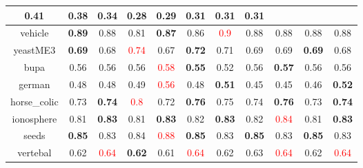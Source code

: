 \documentclass{article}%
\begin{document}
\begin{tabular}{c|cccccccccc}
{0.41
}&0.38&\textbf{0.34}&0.28&0.29&\textbf{0.31}&0.31&0.31\\%
\hline%
vehicle&\textbf{0.89}&0.88&0.81&\textbf{0.87}&0.86&\textcolor{red}{ 
0.9
}&0.88&0.88&0.88&0.88\\%
\hline%
yeastME3&\textbf{0.69}&0.68&\textcolor{red}{ 
0.74
}&0.67&\textbf{0.72}&0.71&0.69&0.69&\textbf{0.69}&0.68\\%
\hline%
bupa&0.56&0.56&0.56&\textcolor{red}{ 
0.58
}&\textbf{0.55}&0.52&0.56&\textbf{0.57}&0.56&0.56\\%
\hline%
german&0.48&0.48&0.49&\textcolor{red}{ 
0.56
}&0.48&\textbf{0.51}&0.45&0.45&0.46&\textbf{0.52}\\%
\hline%
horse\_colic&0.73&\textbf{0.74}&\textcolor{red}{ 
0.8
}&0.72&\textbf{0.76}&0.75&0.74&\textbf{0.76}&0.73&\textbf{0.74}\\%
\hline%
ionosphere&0.81&\textbf{0.83}&0.81&\textbf{0.83}&0.82&\textbf{0.83}&0.82&\textcolor{red}{ 
0.84
}&0.81&\textbf{0.83}\\%
\hline%
seeds&\textbf{0.85}&0.83&0.84&\textcolor{red}{ 
0.88
}&\textbf{0.85}&0.83&\textbf{0.85}&0.83&\textbf{0.85}&0.83\\%
\hline%
vertebal&0.62&\textcolor{red}{ 
0.64
}&\textbf{0.62}&0.61&\textcolor{red}{ 
0.64
}&0.62&0.63&\textcolor{red}{ 
0.64
}&0.62&\textcolor{red}{ 
0.64
}\\%
\hline%
\end{tabular}

%
\end{document}
